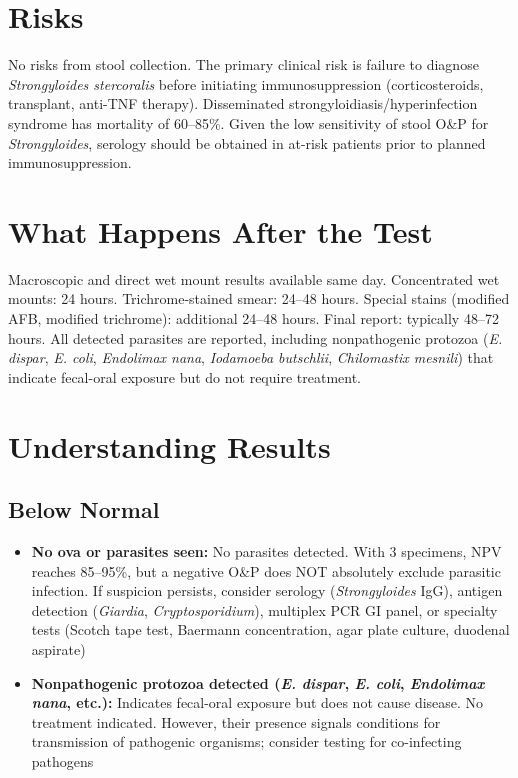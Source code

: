 \section*{Risks}
No risks from stool collection. The primary clinical risk is failure to diagnose \textit{Strongyloides stercoralis} before initiating immunosuppression (corticosteroids, transplant, anti-TNF therapy). Disseminated strongyloidiasis/hyperinfection syndrome has mortality of 60--85\%. Given the low sensitivity of stool O\&P for \textit{Strongyloides}, serology should be obtained in at-risk patients prior to planned immunosuppression.

\section*{What Happens After the Test}
Macroscopic and direct wet mount results available same day. Concentrated wet mounts: 24 hours. Trichrome-stained smear: 24--48 hours. Special stains (modified AFB, modified trichrome): additional 24--48 hours. Final report: typically 48--72 hours. All detected parasites are reported, including nonpathogenic protozoa (\textit{E. dispar}, \textit{E. coli}, \textit{Endolimax nana}, \textit{Iodamoeba butschlii}, \textit{Chilomastix mesnili}) that indicate fecal-oral exposure but do not require treatment.

\section*{Understanding Results}

\subsection*{Below Normal}
\begin{itemize}
  \item \textbf{No ova or parasites seen:} No parasites detected. With 3 specimens, NPV reaches 85--95\%, but a negative O\&P does NOT absolutely exclude parasitic infection. If suspicion persists, consider serology (\textit{Strongyloides} IgG), antigen detection (\textit{Giardia}, \textit{Cryptosporidium}), multiplex PCR GI panel, or specialty tests (Scotch tape test, Baermann concentration, agar plate culture, duodenal aspirate)
  \item \textbf{Nonpathogenic protozoa detected (\textit{E. dispar}, \textit{E. coli}, \textit{Endolimax nana}, etc.):} Indicates fecal-oral exposure but does not cause disease. No treatment indicated. However, their presence signals conditions for transmission of pathogenic organisms; consider testing for co-infecting pathogens
\end{itemize}


